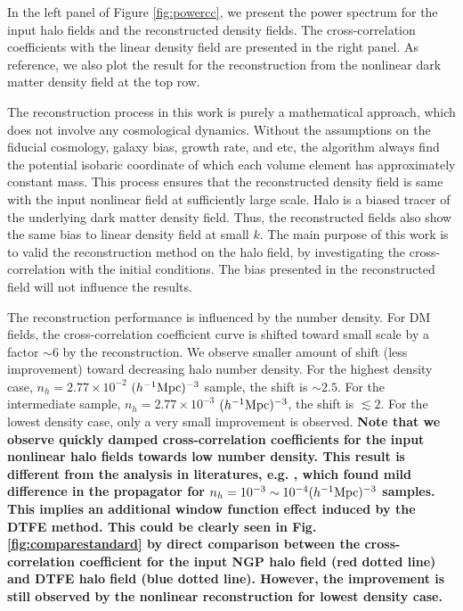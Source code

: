 \documentclass[iop]{emulateapj}
\newcommand{\mpch}{h^{-1} {\rm Mpc}}
\begin{document}
{In the left panel of Figure \ref{fig:powercc}, we present the power spectrum for the input halo fields and the reconstructed density fields.
The cross-correlation coefficients with the linear density field are presented in the right panel.
As reference, we also plot the result for the reconstruction from the nonlinear dark matter density field at the top row.

The reconstruction process in this work is purely a mathematical approach, 
which does not involve any cosmological dynamics.
Without the assumptions on the fiducial cosmology, galaxy bias, growth rate, and etc,
the algorithm always find the potential isobaric coordinate of which each volume element has approximately constant mass.
This process ensures that the reconstructed density field is same with the input nonlinear field at sufficiently large scale.
Halo is a biased tracer of the underlying dark matter density field.
Thus, the reconstructed fields also show the same bias to linear density field at small $k$.
The main purpose of this work is to valid the reconstruction method on the halo field, by investigating the cross-correlation with the initial conditions.
The bias presented in the reconstructed field will not influence the results.

The reconstruction performance is influenced by the number density.
For DM fields, the cross-correlation coefficient curve is shifted toward small scale by a factor $\sim 6$ by the reconstruction.
We observe smaller amount of shift (less improvement) toward decreasing halo number density.
For the highest density case, $n_h=2.77\times 10^{-2}$ $(\mpch)^{-3}$ sample, the shift is $\sim 2.5$.
For the intermediate sample, $n_h=2.77\times 10^{-3}$ $(\mpch)^{-3}$, the shift is $\lesssim 2$.
For the lowest density case, only a very small improvement is observed.
{\bf Note that we observe quickly damped cross-correlation coefficients for the input nonlinear halo fields towards low number density.
This result is different from the analysis in literatures, e.g. \cite{Mehta11}, which found mild difference in the propagator for $n_h=10^{-3}\sim 10^{-4} (\mpch)^{-3}$ samples.
This implies an additional window function effect induced by the DTFE method.
This could be clearly seen in Fig. \ref{fig:comparestandard} by direct comparison between the cross-correlation coefficient for the input NGP halo field (red dotted line) and DTFE halo field (blue dotted line).
However, the improvement is still observed by the nonlinear reconstruction for lowest density case.}

}
\end{document}
